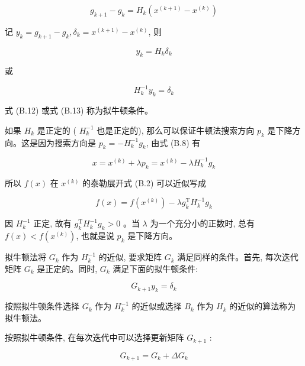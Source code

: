 \documentclass[10pt]{article}
\begin{document}
\begin{equation*}
g_{k+1}-g_{k}=H_{k}\left(x^{(k+1)}-x^{(k)}\right) \tag{B.11}
\end{equation*}


记 $y_{k}=g_{k+1}-g_{k}, \delta_{k}=x^{(k+1)}-x^{(k)}$, 则


\begin{equation*}
y_{k}=H_{k} \delta_{k} \tag{B.12}
\end{equation*}


或


\begin{equation*}
H_{k}^{-1} y_{k}=\delta_{k} \tag{B.13}
\end{equation*}


式 (B.12) 或式 (B.13) 称为拟牛顿条件。

如果 $H_{k}$ 是正定的 ( $H_{k}^{-1}$ 也是正定的), 那么可以保证牛顿法搜索方向 $p_{k}$ 是下降方向。这是因为搜索方向是 $p_{k}=-H_{k}^{-1} g_{k}$, 由式 (B.8) 有


\begin{equation*}
x=x^{(k)}+\lambda p_{k}=x^{(k)}-\lambda H_{k}^{-1} g_{k} \tag{B.14}
\end{equation*}


所以 $f(x)$ 在 $x^{(k)}$ 的泰勒展开式 (B.2) 可以近似写成


\begin{equation*}
f(x)=f\left(x^{(k)}\right)-\lambda g_{k}^{\mathrm{T}} H_{k}^{-1} g_{k} \tag{B.15}
\end{equation*}


因 $H_{k}^{-1}$ 正定, 故有 $g_{k}^{\mathrm{T}} H_{k}^{-1} g_{k}>0$ 。当 $\lambda$ 为一个充分小的正数时, 总有 $f(x)<f\left(x^{(k)}\right)$, 也就是说 $p_{k}$ 是下降方向。

拟牛顿法将 $G_{k}$ 作为 $H_{k}^{-1}$ 的近似, 要求矩阵 $G_{k}$ 满足同样的条件。首先, 每次迭代矩阵 $G_{k}$ 是正定的。同时, $G_{k}$ 满足下面的拟牛顿条件:


\begin{equation*}
G_{k+1} y_{k}=\delta_{k} \tag{B.16}
\end{equation*}


按照拟牛顿条件选择 $G_{k}$ 作为 $H_{k}^{-1}$ 的近似或选择 $B_{k}$ 作为 $H_{k}$ 的近似的算法称为拟牛顿法。

按照拟牛顿条件, 在每次迭代中可以选择更新矩阵 $G_{k+1}$ :


\begin{equation*}
G_{k+1}=G_{k}+\Delta G_{k} \tag{B.17}
\end{equation*}
\end{document}

